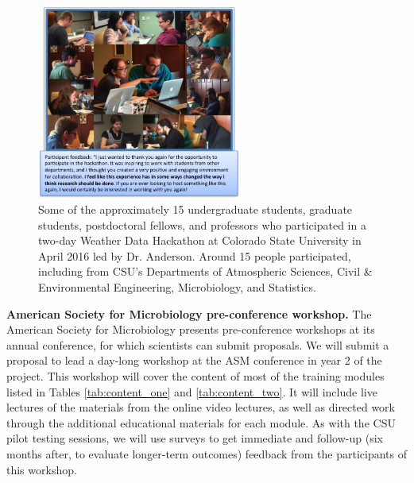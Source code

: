 \documentclass[pdftex,english,11pt,parskip=half]{scrartcl}
\begin{document}
\begin{figure} \centering \includegraphics[width =
0.6\textwidth]{figures/csu_hackathon.png} \caption{Some of the approximately 15
undergraduate students, graduate students, postdoctoral fellows, and professors
who participated in a two-day Weather Data Hackathon at Colorado State
University in April 2016 led by Dr. Anderson. Around 15 people participated, including from CSU's Departments of
Atmospheric Sciences, Civil \& Environmental Engineering, Microbiology, and
Statistics. } \label{csu-r-hackathon}
\end{figure}

\textbf{American Society for Microbiology pre-conference workshop.}
The American Society for Microbiology presents pre-conference workshops at its annual 
conference, for which scientists can submit proposals. We will submit a proposal 
to lead a day-long workshop at the ASM conference in year 2 of the project. This 
workshop will cover the content of most of the training modules listed in Tables
\ref{tab:content_one} and \ref{tab:content_two}. It will include live lectures of the 
materials from the online video lectures, as well as directed work through the 
additional educational materials for each module. As with the CSU pilot testing sessions, we will use surveys to get immediate and follow-up (six months after, to evaluate longer-term outcomes) feedback from 
the participants of this workshop.
\end{document}
